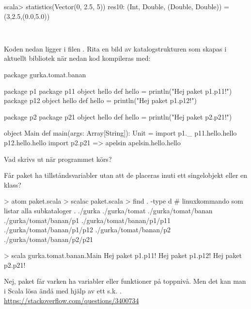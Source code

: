 \begin{REPL}
scala> statistics(Vector(0, 2.5, 5))
res10: (Int, Double, (Double, Double)) = (3,2.5,(0.0,5.0))
\end{REPL}

\QUESTEND





\QUESTBEGIN

\Task \what~

\Subtask Koden nedan ligger i filen . Rita en bild av katalogstrukturen som skapas i aktuellt bibliotek när nedan kod kompileras med: 
\begin{Code}
package gurka.tomat.banan

package p1 {
  package p11 {
    object hello {
      def hello = println("Hej paket p1.p11!")
    }
  }
  package p12 {
    object hello {
      def hello = println("Hej paket p1.p12!")
    }
  }
}

package p2 {
  package p21 {
    object hello {
      def hello = println("Hej paket p2.p21!")
    }
  }
}

object Main {
  def main(args: Array[String]): Unit = {
    import p1._
    p11.hello.hello
    p12.hello.hello
    import p2.{p21 => apelsin}
    apelsin.hello.hello
  }
}
\end{Code}

\Subtask Vad skrivs ut när programmet körs?

\Subtask Får paket ha tillståndsvariabler utan att de placeras inuti ett singelobjekt eller en klass?

\SOLUTION

\TaskSolved \what

\SubtaskSolved

\begin{REPL}
> atom paket.scala
> scalac paket.scala
> find . -type d         # linuxkommando som listar alla subkataloger
.
./gurka
./gurka/tomat
./gurka/tomat/banan
./gurka/tomat/banan/p1
./gurka/tomat/banan/p1/p11
./gurka/tomat/banan/p1/p12
./gurka/tomat/banan/p2
./gurka/tomat/banan/p2/p21
\end{REPL}

\SubtaskSolved
\begin{REPL}
> scala gurka.tomat.banan.Main
Hej paket p1.p11!
Hej paket p1.p12!
Hej paket p2.p21!
\end{REPL}

\SubtaskSolved Nej, paket får varken ha variabler eller funktioner på toppnivå. Men det kan man i Scala lösa ändå med hjälp av ett s.k. . \\
 \url{https://stackoverflow.com/questions/3400734}

